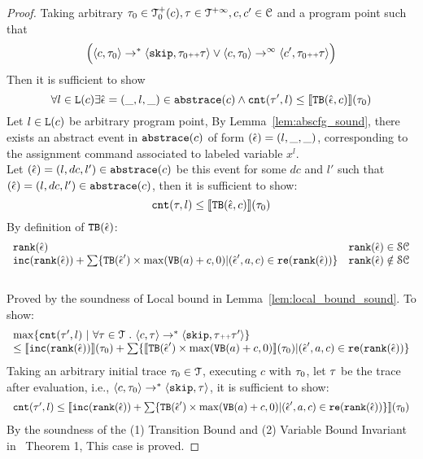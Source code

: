 \begin{proof}
  Taking arbitrary $\mathtt{\tau}_0 \in \mathcal{T}^{+}_0(c), \mathtt{\tau} \in \mathcal{T}^{+\infty}, c, c' \in \mathcal{C}$ and a program point
  such that
  \[
    \Big( \langle c, \mathtt{\tau}_0 \rangle \rightarrow^{*} \langle \mathtt{skip}, \mathtt{\tau}_0 {\scriptscriptstyle ++} \mathtt{\tau} \rangle 
    \lor  \langle c, \mathtt{\tau}_0 \rangle \rightarrow^{\infty} \langle c', \mathtt{\tau}_0 {\scriptscriptstyle ++} \mathtt{\tau} \rangle \Big)
  \]
  Then it is sufficient to show 
  \[
    \forall l \in \mathtt{L}(c) \exists \hat{\mathtt{\epsilon}{}} = (\_, l, \_) \in \mathtt{abs}{\mathtt{trace}}(c) \land
    \mathtt{cnt}(\mathtt{\tau}', l) \leq \llbracket {\ensuremath{\mathtt{TB}}}(\hat{\mathtt{\epsilon}{}}, c) \rrbracket(\mathtt{\tau}_0)
  \]
  Let $l \in \mathtt{L}(c)$ be arbitrary program point,
  By Lemma~\ref{lem:abscfg_sound}, there exists an abstract event in $\mathtt{abs}{\mathtt{trace}}(c)$ of form $(\hat{\mathtt{\epsilon}{}}) = (l, \_, \_)$,
  corresponding to the assignment command associated to labeled variable $x^l$. 
  \\
  Let $(\hat{\mathtt{\epsilon}{}}) = (l, dc, l') \in \mathtt{abs}{\mathtt{trace}}(c)$ be this event for some $dc$ and $l'$ such that  $(\hat{\mathtt{\epsilon}{}}) = (l, dc, l') \in \mathtt{abs}{\mathtt{trace}}(c)$,
   then it is sufficient to show:
  \[
    \mathtt{cnt}(\mathtt{\tau}, l) \leq \llbracket {\ensuremath{\mathtt{TB}}}(\hat{\mathtt{\epsilon}{}}, c) \rrbracket(\mathtt{\tau}_0)
  \]
  By definition of ${\mathtt{TB}}(\hat{\mathtt{\epsilon}{}})$:
  \[
 \begin{array}{ll}
  \mathtt{rank}(\hat{\mathtt{\epsilon}{}}) & \mathtt{rank}(\hat{\mathtt{\epsilon}{}}) \in \mathcal{SC} \\
  \mathtt{inc}(\mathtt{rank}(\hat{\mathtt{\epsilon}{}})) + 
  \sum\{{\mathtt{TB}}(\hat{\mathtt{\epsilon}{}}') \times \max({\mathtt{VB}}(a) + c, 0) | (\hat{\mathtt{\epsilon}{}}', a, c) \in \mathtt{re}(\mathtt{rank}(\hat{\mathtt{\epsilon}{}}))\} 
  & \mathtt{rank}(\hat{\mathtt{\epsilon}{}}) \notin \mathcal{SC}
\end{array}
\]
  \caseL{$\locbound(\absevent) \in \constdom$}
  \\
  Proved by the soundness of Local bound in Lemma~\ref{lem:local_bound_sound}.
  \caseL{$\locbound(\absevent) \notin \constdom$}
To show:
\[
  \begin{array}{l}
    \max \left\{ \counter(\vtrace',  l) ~ \middle\vert~
\forall \vtrace \in \mathcal{T} \st \config{{c}, \trace} \to^{*} \config{\eskip, \trace\tracecat\vtrace'} \right\} 
\\
\leq 
\econfig{\inc(\locbound(\absevent))}(\trace_0) + 
\sum\{\econfig{\absclr(\absevent') \times \max(\varinvar(a) + c, 0)}(\trace_0) | (\absevent', a, c) \in \reset(\locbound(\absevent))\} 
\end{array}
\]
  Taking an arbitrary initial trace
  $\mathtt{\tau}_0 \in \mathcal{T}$, 
  executing $c$ with $\mathtt{\tau}_0$, let $\mathtt{\tau}$ be the trace after evaluation, i.e., $\langle {c}, \mathtt{\tau}_0 \rangle \to^{*} \langle \mathtt{skip},\mathtt{\tau} \rangle$, it is sufficient to show:
  \[ 
    \begin{array}{l}
      \mathtt{cnt}(\mathtt{\tau}',  l) \leq 
    \llbracket \mathtt{inc}(\mathtt{rank}(\hat{\mathtt{\epsilon}{}})) + 
    \sum\{{\mathtt{TB}}(\hat{\mathtt{\epsilon}{}}') \times \max({\mathtt{VB}}(a) + c, 0) | (\hat{\mathtt{\epsilon}{}}', a, c) \in \mathtt{re}(\mathtt{rank}(\hat{\mathtt{\epsilon}{}}))\} \rrbracket(\mathtt{\tau}_0)
  \end{array}
  \]
%
 By the soundness of the (1) Transition Bound and (2) Variable Bound Invariant 
 in~\cite{SinnZV17} Theorem 1, 
This case is proved.
\end{proof}


%
